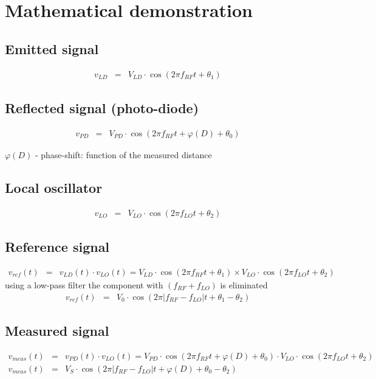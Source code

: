 \documentclass[fleqn]{article}
\begin{document}
\section{Mathematical demonstration}
\subsection{Emitted signal}
\begin{eqnarray}
v_{LD} &=& V_{LD} \cdot \cos\left(2\pi f_{RF}t+\theta_1\right) \nonumber
\end{eqnarray}
\subsection{Reflected signal (photo-diode)}
\begin{eqnarray}
v_{PD} &=& V_{PD} \cdot \cos\left(2\pi f_{RF}t+\varphi(D)+\theta_0\right) \nonumber
\end{eqnarray}

$\varphi(D)$ - phase-shift: function of the measured distance

\subsection{Local oscillator}
\begin{eqnarray}
v_{LO} &=& V_{LO} \cdot \cos\left(2\pi f_{LO}t+\theta_2\right) \nonumber
\end{eqnarray}
\subsection{Reference signal}
\begin{eqnarray}
v_{ref}(t) &=& v_{LD}(t)\cdot v_{LO}(t) = V_{LD}\cdot\cos\left(2\pi f_{RF}t + \theta_1\right)\times V_{LO}\cdot\cos\left(2\pi f_{LO}t + \theta_2\right) \nonumber
\end{eqnarray}
using a low-pass filter the component with $\left(f_{RF}+f_{LO}\right)$ is eliminated
\begin{eqnarray}
v_{ref}(t) &=& V_0\cdot\cos\left(2\pi|f_{RF}-f_{LO}|t+\theta_1-\theta_2\right) \nonumber
\end{eqnarray}
\subsection{Measured signal}
\begin{eqnarray}
v_{meas}(t)&=&v_{PD}(t)\cdot v_{LO}(t) =V_{PD} \cdot \cos\left(2\pi f_{RF}t+\varphi(D)+\theta_0\right)\cdot V_{LO} \cdot \cos\left(2\pi f_{LO}t+\theta_2\right) \nonumber \\
v_{meas}(t)&=&V_S\cdot\cos\left(2\pi|f_{RF}-f_{LO}|t+\varphi(D)+\theta_0-\theta_2\right) \nonumber
\end{eqnarray}
\end{document}
